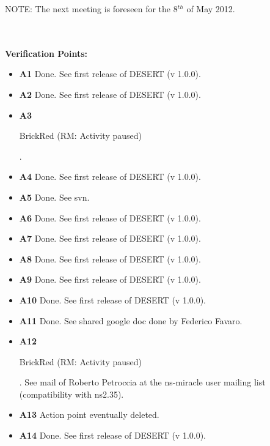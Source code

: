 \documentclass[11pt,journal,draftclsnofoot,onecolumn,twoside,letterpaper]{IEEEtran}
\newcommand{\RM}[1]{\begin{color}{BrickRed} (RM: #1) \end{color}}
\theoremstyle{definition} \newtheorem{definition}[]{Definition}
\theoremstyle{theorem} \newtheorem{theorem}[]{Theorem}
\begin{document}
NOTE: The next meeting is foreseen for the 8$^{th}$ of May 2012.

\ \\
\ \\
{\bf Verification Points:}
\begin{itemize}
  \item {\bf A1} Done. See first release of DESERT (v 1.0.0). 
  \item {\bf A2} Done. See first release of DESERT (v 1.0.0).
  \item {\bf A3} \RM{Activity paused}.
  \item {\bf A4} Done. See first release of DESERT (v 1.0.0).
  \item {\bf A5} Done. See svn.
  \item {\bf A6} Done. See first release of DESERT (v 1.0.0).
  \item {\bf A7} Done. See first release of DESERT (v 1.0.0).
  \item {\bf A8} Done. See first release of DESERT (v 1.0.0).
  \item {\bf A9} Done. See first release of DESERT (v 1.0.0).
  \item {\bf A10} Done. See first release of DESERT (v 1.0.0).
  \item {\bf A11} Done. See shared google doc done by Federico Favaro.
  \item {\bf A12}  \RM{Activity paused}. See mail of Roberto Petroccia at the ns-miracle user mailing list (compatibility with ns2.35).
  \item {\bf A13} Action point eventually deleted.
  \item {\bf A14} Done. See first release of DESERT (v 1.0.0).
\end{itemize}
\end{document}
